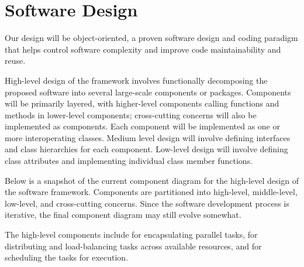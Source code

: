 \documentclass[10pt]{article}
\begin{document}
\section{Software Design} \label{s:design}


Our design will be object-oriented, a proven software design and
coding paradigm that helps control software complexity and improve
code maintainability and reuse.

High-level design of the framework involves functionally decomposing
the proposed software into several large-scale components or packages.
Components will be primarily layered, with higher-level components
calling functions and methods in lower-level components; cross-cutting
concerns will also be implemented as components.  Each component will
be implemented as one or more interoperating classes.  Medium level
design will involve defining interfaces and class hierarchies for each
component.  Low-level design will involve defining class attributes
and implementing individual class member functions.

Below is a snapshot of the current component diagram for the
high-level design of the software framework.  Components are
partitioned into high-level, middle-level, low-level, and
cross-cutting concerns.  Since the software development process is
iterative, the final component diagram may still evolve somewhat.


The high-level components include  for encapsulating
parallel tasks,  for distributing and load-balancing
tasks across available resources, and  for scheduling
the tasks for execution.
\end{document}
